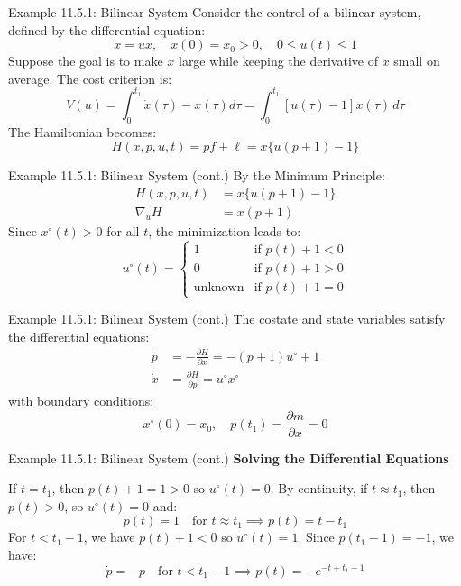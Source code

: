 \documentclass[10pt]{beamer}
\begin{document}
\begin{frame}[fragile]{Example 11.5.1: Bilinear System}
  Consider the control of a bilinear system, defined by the differential equation:
  \[
  \dot{x} = ux, \quad x(0) = x_0 > 0, \quad 0 \le u(t) \le 1
  \]
  Suppose the goal is to make \( x \) large while keeping the derivative of \( x \) small on average. The cost criterion is:
  \[
    V(u) = \int_0^{t_1}\dot{x}(\tau)-x(\tau)d\tau = \int_0^{t_1} [u(\tau) - 1]x(\tau) \, d\tau
  \]
  The Hamiltonian becomes:
  \[
    H(x, p, u, t) = pf+\ell = x \{ u(p + 1) - 1 \}
  \]
\end{frame}
  
\begin{frame}[fragile]{Example 11.5.1: Bilinear System (cont.)}
  By the Minimum Principle:
  \[
    \begin{aligned}
      H(x, p, u, t) &= x \{ u(p + 1) - 1 \} \\
      \nabla_u H &= x(p + 1)
    \end{aligned}
  \]
  Since \( x^{\circ}(t) > 0 \) for all $t$, the minimization leads to:
  \[
  u^\circ(t) = \begin{cases}
  1 & \text{if } p(t) + 1 < 0 \\
  0 & \text{if } p(t) + 1 > 0 \\
  \text{unknown} & \text{if } p(t)+1 = 0
  \end{cases}
  \]
\end{frame}
  
\begin{frame}[fragile]{Example 11.5.1: Bilinear System (cont.)}
  The costate and state variables satisfy the differential equations:
  \[
  \begin{aligned}
    \dot{p} &= - \frac{\partial H}{\partial x} = -(p+1)u^{\circ}+1 \\
    \dot{x} &= \frac{\partial H}{\partial p} = u^{\circ}x^{\circ}
  \end{aligned}
  \]
  with boundary conditions:
  \[
    x^{\circ}(0)=x_0, \quad p(t_1)=\frac{\partial m}{\partial x} = 0
  \]
\end{frame}
  
\begin{frame}[fragile]{Example 11.5.1: Bilinear System (cont.)}
  \textbf{Solving the Differential Equations}
  
  If \( t = t_1 \), then \( p(t) + 1 = 1 > 0 \) so \( u^\circ(t) = 0 \). By continuity, if \( t \approx t_1 \), then \( p(t) > 0 \), so \( u^\circ(t) = 0 \) and:
  \[
  \dot{p}(t) = 1 \quad \text{for } t \approx t_1 \implies p(t) = t - t_1
  \]
  For \( t < t_1 - 1 \), we have \( p(t) + 1 < 0 \) so \( u^\circ(t) = 1 \). Since $p(t_1-1)=-1$, we have:
  \[
  \dot{p} = -p \quad \text{for } t < t_1 - 1 \implies p(t) = -e^{-t + t_1 - 1}
  \]
\end{frame}
\end{document}

